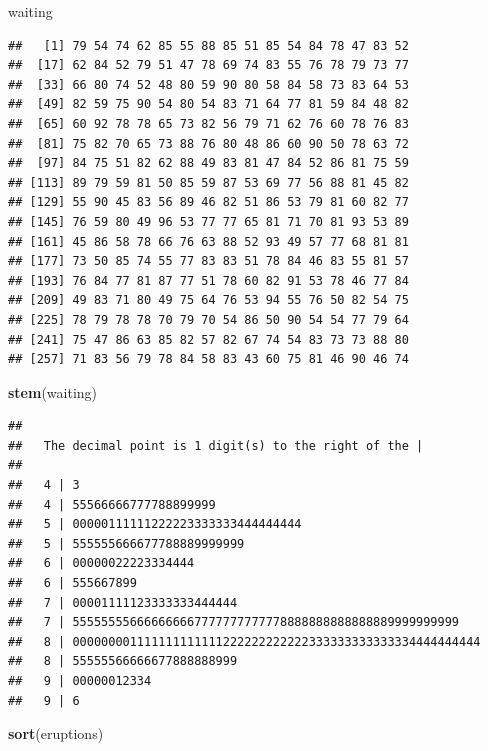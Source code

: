 \documentclass[10pt,]{krantz}
\makeatletter
\newenvironment{Shaded}{\begin{snugshade}}{\end{snugshade}}
\newcommand{\KeywordTok}[1]{\textcolor[rgb]{0.13,0.29,0.53}{\textbf{#1}}}
\newcommand{\NormalTok}[1]{#1}
\newenvironment{kframe}{%
\medskip{}
\setlength{\fboxsep}{.8em}
 \def\at@end@of@kframe{}%
 \ifinner\ifhmode%
  \def\at@end@of@kframe{\end{minipage}}%
  \begin{minipage}{\columnwidth}%
 \fi\fi%
 \def\FrameCommand##1{\hskip\@totalleftmargin \hskip-\fboxsep
 \colorbox{shadecolor}{##1}\hskip-\fboxsep
     \hskip-\linewidth \hskip-\@totalleftmargin \hskip\columnwidth}%
 \MakeFramed {\advance\hsize-\width
   \@totalleftmargin\z@ \linewidth\hsize
   \@setminipage}}%
 {\par\unskip\endMakeFramed%
 \at@end@of@kframe}
\renewenvironment{Shaded}{\begin{kframe}}{\end{kframe}}
\makeatother
\begin{document}
\begin{Shaded}
\begin{Highlighting}[]
\NormalTok{waiting}
\end{Highlighting}
\end{Shaded}

\begin{verbatim}
##   [1] 79 54 74 62 85 55 88 85 51 85 54 84 78 47 83 52
##  [17] 62 84 52 79 51 47 78 69 74 83 55 76 78 79 73 77
##  [33] 66 80 74 52 48 80 59 90 80 58 84 58 73 83 64 53
##  [49] 82 59 75 90 54 80 54 83 71 64 77 81 59 84 48 82
##  [65] 60 92 78 78 65 73 82 56 79 71 62 76 60 78 76 83
##  [81] 75 82 70 65 73 88 76 80 48 86 60 90 50 78 63 72
##  [97] 84 75 51 82 62 88 49 83 81 47 84 52 86 81 75 59
## [113] 89 79 59 81 50 85 59 87 53 69 77 56 88 81 45 82
## [129] 55 90 45 83 56 89 46 82 51 86 53 79 81 60 82 77
## [145] 76 59 80 49 96 53 77 77 65 81 71 70 81 93 53 89
## [161] 45 86 58 78 66 76 63 88 52 93 49 57 77 68 81 81
## [177] 73 50 85 74 55 77 83 83 51 78 84 46 83 55 81 57
## [193] 76 84 77 81 87 77 51 78 60 82 91 53 78 46 77 84
## [209] 49 83 71 80 49 75 64 76 53 94 55 76 50 82 54 75
## [225] 78 79 78 78 70 79 70 54 86 50 90 54 54 77 79 64
## [241] 75 47 86 63 85 82 57 82 67 74 54 83 73 73 88 80
## [257] 71 83 56 79 78 84 58 83 43 60 75 81 46 90 46 74
\end{verbatim}

\begin{Shaded}
\begin{Highlighting}[]
\KeywordTok{stem}\NormalTok{(waiting)}
\end{Highlighting}
\end{Shaded}

\begin{verbatim}
## 
##   The decimal point is 1 digit(s) to the right of the |
## 
##   4 | 3
##   4 | 55566666777788899999
##   5 | 00000111111222223333333444444444
##   5 | 555555666677788889999999
##   6 | 00000022223334444
##   6 | 555667899
##   7 | 00001111123333333444444
##   7 | 555555556666666667777777777778888888888888889999999999
##   8 | 000000001111111111111222222222222333333333333334444444444
##   8 | 55555566666677888888999
##   9 | 00000012334
##   9 | 6
\end{verbatim}

\begin{Shaded}
\begin{Highlighting}[]
\KeywordTok{sort}\NormalTok{(eruptions)}
\end{Highlighting}
\end{Shaded}
\end{document}
